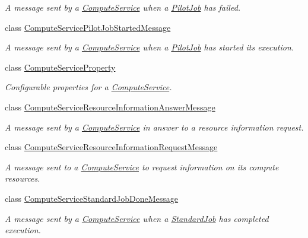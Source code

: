 \begin{DoxyCompactItemize}
\begin{DoxyCompactList}\small\item\em A message sent by a \hyperlink{classwrench_1_1_compute_service}{Compute\+Service} when a \hyperlink{classwrench_1_1_pilot_job}{Pilot\+Job} has failed. \end{DoxyCompactList}\item 
class \hyperlink{classwrench_1_1_compute_service_pilot_job_started_message}{Compute\+Service\+Pilot\+Job\+Started\+Message}
\begin{DoxyCompactList}\small\item\em A message sent by a \hyperlink{classwrench_1_1_compute_service}{Compute\+Service} when a \hyperlink{classwrench_1_1_pilot_job}{Pilot\+Job} has started its execution. \end{DoxyCompactList}\item 
class \hyperlink{classwrench_1_1_compute_service_property}{Compute\+Service\+Property}
\begin{DoxyCompactList}\small\item\em Configurable properties for a \hyperlink{classwrench_1_1_compute_service}{Compute\+Service}. \end{DoxyCompactList}\item 
class \hyperlink{classwrench_1_1_compute_service_resource_information_answer_message}{Compute\+Service\+Resource\+Information\+Answer\+Message}
\begin{DoxyCompactList}\small\item\em A message sent by a \hyperlink{classwrench_1_1_compute_service}{Compute\+Service} in answer to a resource information request. \end{DoxyCompactList}\item 
class \hyperlink{classwrench_1_1_compute_service_resource_information_request_message}{Compute\+Service\+Resource\+Information\+Request\+Message}
\begin{DoxyCompactList}\small\item\em A message sent to a \hyperlink{classwrench_1_1_compute_service}{Compute\+Service} to request information on its compute resources. \end{DoxyCompactList}\item 
class \hyperlink{classwrench_1_1_compute_service_standard_job_done_message}{Compute\+Service\+Standard\+Job\+Done\+Message}
\begin{DoxyCompactList}\small\item\em A message sent by a \hyperlink{classwrench_1_1_compute_service}{Compute\+Service} when a \hyperlink{classwrench_1_1_standard_job}{Standard\+Job} has completed execution. \end{DoxyCompactList}\item 

\end{DoxyCompactItemize}
